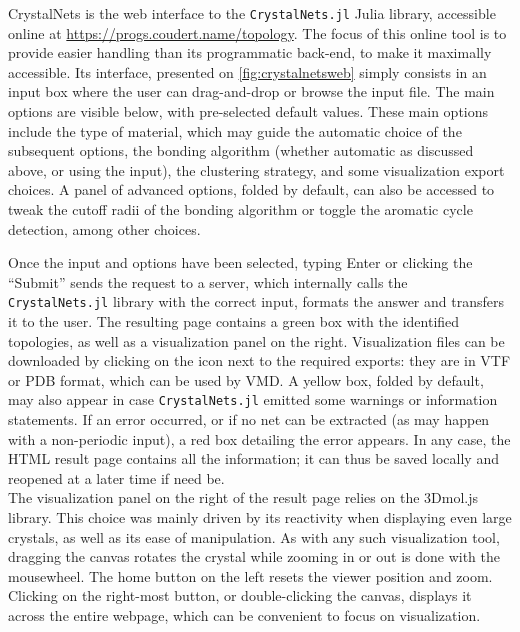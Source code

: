 \documentclass[main.tex]{subfiles}
\begin{document}
CrystalNets is the web interface to the \texttt{CrystalNets.jl} Julia library, accessible online at \url{https://progs.coudert.name/topology}. The focus of this online tool is to provide easier handling than its programmatic back-end, to make it maximally accessible. Its interface, presented on \cref{fig:crystalnetsweb} simply consists in an input box where the user can drag-and-drop or browse the input file. The main options are visible below, with pre-selected default values. These main options include the type of material, which may guide the automatic choice of the subsequent options, the bonding algorithm (whether automatic as discussed above, or using the input), the clustering strategy, and some visualization export choices.
A panel of advanced options, folded by default, can also be accessed to tweak the cutoff radii of the bonding algorithm or toggle the aromatic cycle detection, among other choices.

Once the input and options have been selected, typing Enter or clicking the ``Submit'' sends the request to a server, which internally calls the \texttt{CrystalNets.jl} library with the correct input, formats the answer and transfers it to the user. The resulting page contains a green box with the identified topologies, as well as a visualization panel on the right.
Visualization files can be downloaded by clicking on the icon next to the required  exports: they are in VTF or PDB format, which can be used by VMD.
A yellow box, folded by default, may also appear in case \texttt{CrystalNets.jl} emitted some warnings or information statements.
If an error occurred, or if no net can be extracted (as may happen with a non-periodic input), a red box detailing the error appears.
In any case, the HTML result page contains all the information; it can thus be saved locally and reopened at a later time if need be.\\



The visualization panel on the right of the result page relies on the 3Dmol.js library. This choice was mainly driven by its reactivity when displaying even large crystals, as well as its ease of manipulation. As with any such visualization tool, dragging the canvas rotates the crystal while zooming in or out is done with the mousewheel. The home button on the left resets the viewer position and zoom. Clicking on the right-most button, or double-clicking the canvas, displays it across the entire webpage, which can be convenient to focus on visualization.
\end{document}
